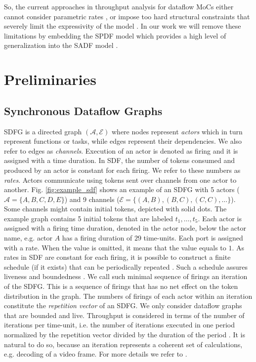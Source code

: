 \documentclass[]{eptcs}
\begin{document}
So, the current approaches in throughput analysis for dataflow MoCs either cannot consider parametric rates \cite{2gha:all}\cite{3gha:all}\cite{2geil:all}\cite{2dam:all}, or impose too hard structural constraints that severely limit the expressivity of the model \cite{2wigg}. In our work we will remove these limitations by embedding the SPDF model \cite{2frad:all} which provides a high level of generalization into the SADF model \cite{2thel:all}\cite{2geil:all}.
\section{Preliminaries}
\subsection{Synchronous Dataflow Graphs}
SDFG is a directed graph $(\mathcal{A}, \mathcal{E})$ where nodes represent \textit{actors} which in turn represent functions or tasks, while edges represent their dependencies. We also refer to edges as \textit{channels}. Execution of an actor is denoted as firing and it is assigned with a time duration. In SDF, the number of tokens consumed and produced by an actor is constant for each firing. We refer to these numbers as \textit{rates}. Actors communicate using tokens sent over channels from one actor to another.
Fig. \ref{fig:example_sdf} shows an example of an SDFG with 5 actors ($\mathcal{A} = \{A,B,C,D,E\}$) and 9 channels ($\mathcal{E} = \{(A,B), (B,C), (C,C), \ldots\}$). Some channels might contain initial tokens, depicted with solid dots. The example graph contains 5 initial tokens that are labeled $t_1,\ldots,t_5$. Each actor is assigned with a firing time duration, denoted in the actor node, below the actor name, e.g. actor $A$ has a firing duration of $29$ time-units. Each port is assigned with a rate. When the value is omitted, it means that the value equals to $1$. 
As rates in SDF are constant for each firing, it is possible to construct a finite schedule (if it exists) that can be periodically repeated \cite{2lee:all}. Such a schedule assures liveness and boundedness \cite{2lee:all}. We call such minimal sequence of firings an iteration of the SDFG. This is a sequence of firings that has no net effect on the token distribution in the graph. The numbers of firings of each actor within an iteration constitute the \textit{repetition vector} of an SDFG. We only consider dataflow graphs that are bounded and live. Throughput is considered in terms of the number of iterations per time-unit, i.e. the number of iterations executed in one period normalized by the repetition vector divided by the duration of the period \cite{2gha:all}. It is natural to do so, because an iteration represents a coherent set of calculations, e.g. decoding of a video frame. For more details we refer to \cite{2lee:all}\cite{2gha:all}.
\end{document}
